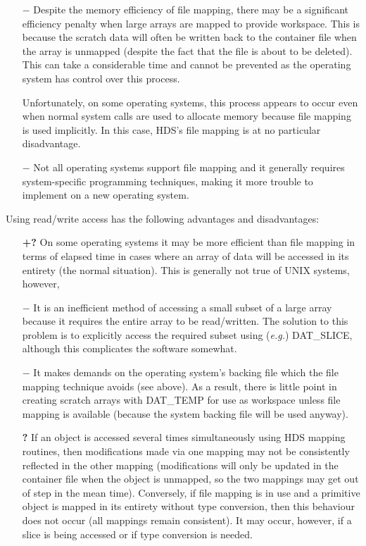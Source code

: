 \documentclass[11pt]{article}
\newcommand{\htmlref}[2]{#1}
\newcommand{\st}[1]{{\em{#1}}}
\newcommand{\mplus}[0]{{$+$}}
\renewcommand{\mplus}[0]{+}
\begin{document}
\begin{description}
\begin{itemize}
\item[{\bf $-$}] Despite the memory efficiency of file mapping, there may be
a significant efficiency penalty when large arrays are mapped to
provide workspace. This is because the scratch data will often be
written back to the container file when the array is unmapped (despite
the fact that the file is about to be deleted). This can take a
considerable time and cannot be prevented as the operating system has
control over this process.

Unfortunately, on some operating systems, this process appears to
occur even when normal system calls are used to allocate memory
because file mapping is used implicitly. In this case, HDS's file
mapping is at no particular disadvantage.

\item[{\bf $-$}] Not all operating systems support file mapping and it
generally requires system-specific programming techniques, making it
more trouble to implement on a new operating system.

\end{itemize}

Using read/write access has the following advantages and
disadvantages:

\begin{itemize}

\item[{\bf \mplus?}] On some operating systems it may be more efficient than
file mapping in terms of elapsed time in cases where an array of data
will be accessed in its entirety (the normal situation). This is
generally not true of UNIX systems, however,

\item[{\bf $-$}] It is an inefficient method of accessing a small subset of
a large array because it requires the entire array to be
read/written. The solution to this problem is to explicitly access the
required subset using (\st{e.g.\/}) \htmlref{DAT\_SLICE}{DAT_SLICE},
although this complicates the software somewhat.

\item[{\bf $-$}] It makes demands on the operating system's backing
file which the file mapping technique avoids (see above). As a result,
there is little point in creating scratch arrays with DAT\_TEMP for
use as workspace unless file mapping is available (because the system
backing file will be used anyway).

\item[{\bf ?}] If an object is accessed several times simultaneously using
HDS mapping routines, then modifications made via one mapping may not
be consistently reflected in the other mapping (modifications will
only be updated in the container file when the object is unmapped, so
the two mappings may get out of step in the mean time). Conversely, if
file mapping is in use and a primitive object is mapped in its
entirety without \htmlref{type conversion}{sect:typeconversion}, then
this behaviour does not occur (all mappings remain consistent). It may
occur, however, if a slice is being accessed or if type conversion is
needed.


\end{itemize}
\end{description}
\end{document}
